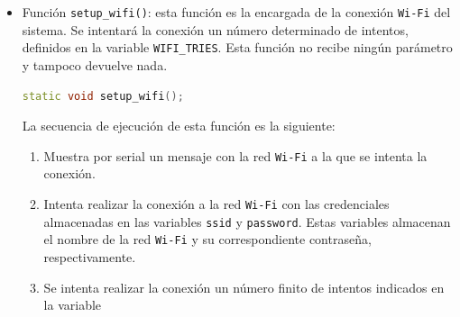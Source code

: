 \begin{itemize}
    \item Función \texttt{setup\_wifi()}: esta función es la encargada de la conexión \texttt{Wi-Fi} del sistema. Se intentará la conexión un número determinado de intentos, definidos en la variable \texttt{WIFI\_TRIES}. Esta función no recibe ningún parámetro y tampoco devuelve nada.
    \begin{lstlisting}[captionpos=b, caption={Definición función setup\_wifi}, language=c++]
        static void setup_wifi();
    \end{lstlisting}
    La secuencia de ejecución de esta función es la siguiente:
    \begin{enumerate}
        \item Muestra por serial un mensaje con la red \texttt{Wi-Fi} a la que se intenta la conexión.
        \item Intenta realizar la conexión a la red \texttt{Wi-Fi} con las credenciales almacenadas en las variables \texttt{ssid} y \texttt{password}. Estas variables almacenan el nombre de la red \texttt{Wi-Fi} y su correspondiente contraseña, respectivamente.
        \item Se intenta realizar la conexión un número finito de intentos indicados en la variable


\end{enumerate}
\end{itemize}
